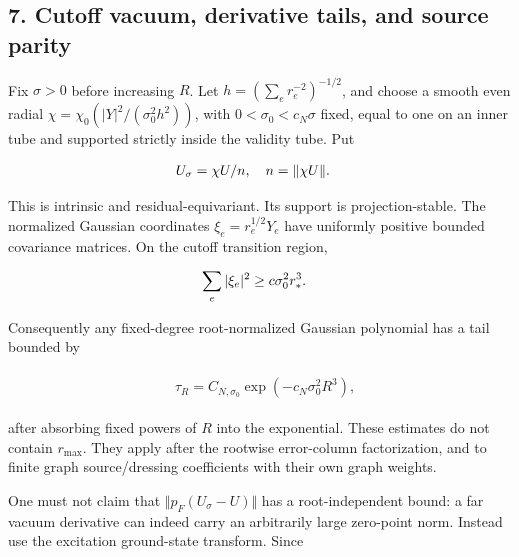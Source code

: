\subsection{7. Cutoff vacuum, derivative tails, and source
parity}\label{i-cutoff-vacuum-derivative-tails-and-source-parity}

Fix \(\sigma >0\) before increasing \(R\). Let
\(h=(\sum _{e} r_{e}^{-2})^{-1/2}\), and choose a smooth even radial
\(\chi =\chi _{0}(\vert Y\vert ^{2}/(\sigma _{0}^{2}h^{2}))\), with
\(0<\sigma _{0}<c_{N} \sigma\) fixed, equal to one on an inner tube and
supported strictly inside the validity tube. Put

\begin{gather*}
\begin{aligned}
& U_{\sigma}=\chi  U/n, \quad  n=\Vert \chi  U\Vert .
\end{aligned}\notag
\end{gather*}

This is intrinsic and residual-equivariant. Its support is
projection-stable. The normalized Gaussian coordinates
\(\xi _{e}=r_{e}^{1/2}Y_{e}\) have uniformly positive bounded covariance
matrices. On the cutoff transition region,

\begin{gather*}
\begin{aligned}
& \sum _{e} \vert \xi _{e}\vert ^{2} \ge  c \sigma _{0}^{2} r_{*}^{3}.
\end{aligned}\notag
\end{gather*}

Consequently any fixed-degree root-normalized Gaussian polynomial has a
tail bounded by

\begin{gather*}
\begin{aligned}
& \tau _{R}=C_{N,\sigma _{0}} \exp (-c_{N} \sigma _{0}^{2} R^{3}),
\end{aligned}\tag{7.1}
\end{gather*}

after absorbing fixed powers of \(R\) into the exponential. These
estimates do not contain \(r_{\max}\). They apply after the rootwise
error-column factorization, and to finite graph source/dressing
coefficients with their own graph weights.

One must not claim that \(\Vert p_{F}(U_{\sigma}-U)\Vert\) has a
root-independent bound: a far vacuum derivative can indeed carry an
arbitrarily large zero-point norm. Instead use the excitation
ground-state transform. Since

